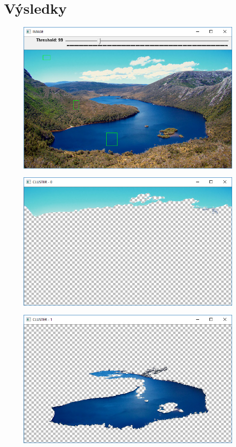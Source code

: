 \documentclass[czech, master, public, dept460, male, cpdeclaration, oneside]{diploma}
\begin{document}
\section{Výsledky}
\begin{figure}[H]
	\vspace*{+3.0mm}
	\centering
	\includegraphics[width=13cm]{Figures/results/euclidean/img1/original.png}
\end{figure}
\begin{figure}[H]
	\vspace*{+3.0mm}
	\centering
	\includegraphics[width=13cm]{Figures/results/euclidean/img1/cluster0.png}
\end{figure}
\begin{figure}[H]
	\vspace*{+3.0mm}
	\centering
	\includegraphics[width=13cm]{Figures/results/euclidean/img1/cluster1.png}
\end{figure}
\end{document}
